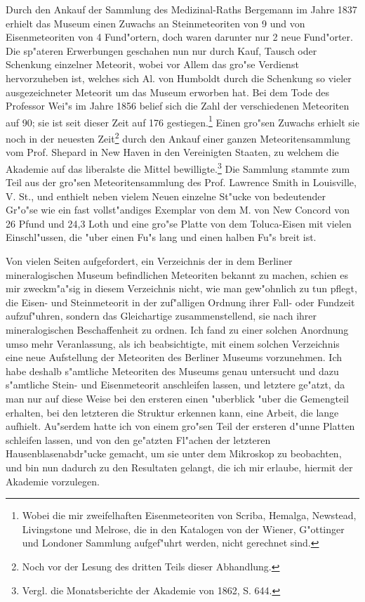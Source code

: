 \documentclass[a4paper, 11pt, oneside, german]{article}
\begin{document}
Durch den Ankauf der Sammlung des Medizinal-Raths Bergemann im Jahre 1837 erhielt das Museum einen Zuwachs an Steinmeteoriten von 9 und von Eisenmeteoriten von 4 Fund"ortern, doch waren darunter nur 2 neue Fund"orter. Die sp"ateren Erwerbungen geschahen nun nur durch Kauf, Tausch oder Schenkung einzelner Meteorit, wobei vor Allem das gro"se Verdienst hervorzuheben ist, welches sich Al. von Humboldt durch die Schenkung so vieler ausgezeichneter Meteorit um das Museum erworben hat. Bei dem Tode des Professor Wei"s im Jahre 1856 belief sich die Zahl der verschiedenen Meteoriten auf 90; sie ist seit dieser Zeit auf 176 gestiegen.\footnote{Wobei die mir zweifelhaften Eisenmeteoriten von Scriba, Hemalga, Newstead, Livingstone und Melrose, die in den Katalogen von der Wiener, G"ottinger und Londoner Sammlung aufgef"uhrt werden, nicht gerechnet sind.} Einen gro"sen Zuwachs erhielt sie noch in der neuesten Zeit\footnote{Noch vor der Lesung des dritten Teils dieser Abhandlung.} durch den Ankauf einer ganzen Meteoritensammlung vom Prof. Shepard in New Haven in den Vereinigten Staaten, zu welchem die Akademie auf das liberalste die Mittel bewilligte.\footnote{Vergl. die Monatsberichte der Akademie von 1862, S. 644.} Die Sammlung stammte zum Teil aus der gro"sen Meteoritensammlung des Prof. Lawrence Smith in Louisville, V. St., und enthielt neben vielem Neuen einzelne St"ucke von bedeutender Gr"o"se wie ein fast vollst"andiges Exemplar von dem M. von New Concord von 26 Pfund und 24,3 Loth und eine gro"se Platte von dem Toluca-Eisen mit vielen Einschl"ussen, die "uber einen Fu"s lang und einen halben Fu"s breit ist.

Von vielen Seiten aufgefordert, ein Verzeichnis der in dem Berliner mineralogischen Museum befindlichen Meteoriten bekannt zu machen, schien es mir zweckm"a"sig in diesem Verzeichnis nicht, wie man gew"ohnlich zu tun pflegt, die Eisen- und Steinmeteorit in der zuf"alligen Ordnung ihrer Fall- oder Fundzeit aufzuf"uhren, sondern das Gleichartige zusammenstellend, sie nach ihrer mineralogischen Beschaffenheit zu ordnen. Ich fand zu einer solchen Anordnung umso mehr Veranlassung, als ich beabsichtigte, mit einem solchen Verzeichnis eine neue Aufstellung der Meteoriten des Berliner Museums vorzunehmen. Ich habe deshalb s"amtliche Meteoriten des Museums genau untersucht und dazu s"amtliche Stein- und Eisenmeteorit anschleifen lassen, und letztere ge"atzt, da man nur auf diese Weise bei den ersteren einen "uberblick "uber die Gemengteil erhalten, bei den letzteren die Struktur erkennen kann, eine Arbeit, die lange aufhielt. Au"serdem hatte ich von einem gro"sen Teil der ersteren d"unne Platten schleifen lassen, und von den ge"atzten Fl"achen der letzteren Hausenblasenabdr"ucke gemacht, um sie unter dem Mikroskop zu beobachten, und bin nun dadurch zu den Resultaten gelangt, die ich mir erlaube, hiermit der Akademie vorzulegen.
\end{document}
